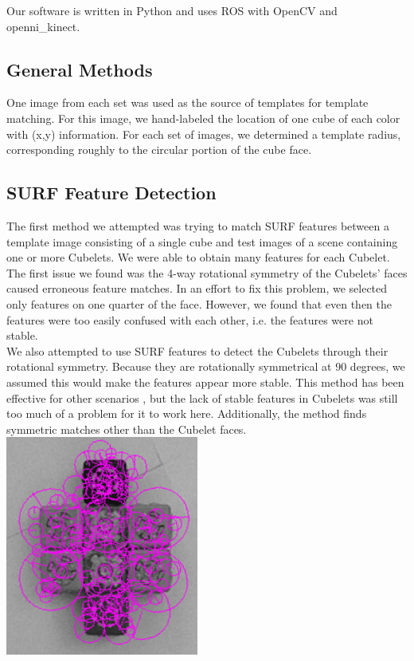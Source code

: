 \documentclass[conference]{IEEEtran}
\begin{document}
Our software is written in Python and uses ROS with OpenCV and openni\_kinect.

\subsection{General Methods}
One image from each set was used as the source of templates for template matching. For this image, we hand-labeled the location of one cube of each color with (x,y) information. For each set of images, we determined a template radius, corresponding roughly to the circular portion of the cube face.  

\subsection{SURF Feature Detection}
The first method we attempted was trying to match SURF features between a template image consisting of a single cube and test images of a scene containing one or more Cubelets. We were able to obtain many features for each Cubelet. The first issue we found was the 4-way rotational symmetry of the Cubelets' faces caused erroneous feature matches. In an effort to fix this problem, we selected only features on one quarter of the face. However, we found that even then the features were too easily confused with each other, i.e. the features were not stable.\\

We also attempted to use SURF features to detect the Cubelets through their rotational symmetry.  Because they are rotationally symmetrical at 90 degrees, we assumed this would make the features appear more stable. This method has been effective for other scenarios \cite{Loy_Eklundh}, but the lack of stable features in Cubelets was still too much of a problem for it to work here. Additionally, the \cite{Loy_Eklundh} method finds symmetric matches other than the Cubelet faces.\\ 

{\includegraphics[width=2.5in]{surf.png}} \\
\end{document}
